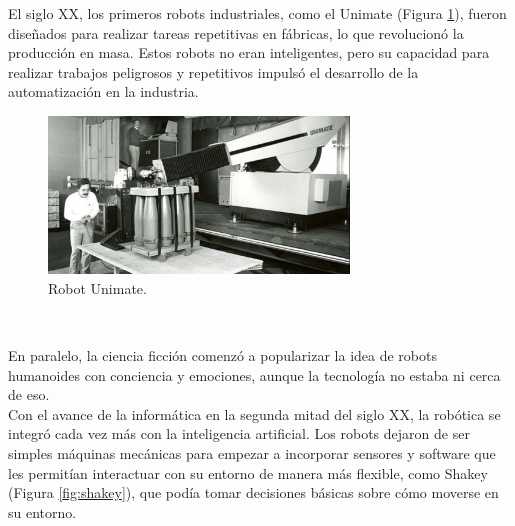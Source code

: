 El siglo XX, los primeros robots industriales, como el Unimate (Figura \ref{fig:unimate}), fueron diseñados para realizar tareas repetitivas en fábricas, lo que revolucionó la producción en masa. Estos robots no eran inteligentes, pero su capacidad para realizar trabajos peligrosos y repetitivos impulsó el desarrollo de la automatización en la industria.\\

\begin{figure} [h!]
  \begin{center}
    \includegraphics[width=8cm]{figs/unimate}
  \end{center}
  \caption{Robot Unimate.}
  \label{fig:unimate}
\end{figure}\

En paralelo, la ciencia ficción comenzó a popularizar la idea de robots humanoides con conciencia y emociones, aunque la tecnología no estaba ni cerca de eso.\\


Con el avance de la informática en la segunda mitad del siglo XX, la robótica se integró cada vez más con la inteligencia artificial. Los robots dejaron de ser simples máquinas mecánicas para empezar a incorporar sensores y software que les permitían interactuar con su entorno de manera más flexible, como Shakey (Figura \ref{fig:shakey}), que podía tomar decisiones básicas sobre cómo moverse en su entorno.

